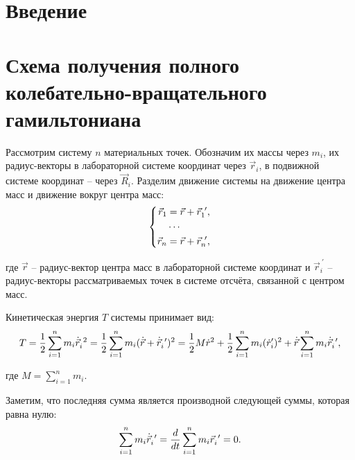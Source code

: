 \documentclass[12pt]{article}
\begin{document}
\section{Введение}

\section{Схема получения полного колебательно-вращательного гамильтониана}

\hspace{0.35cm} Рассмотрим систему $n$ материальных точек. Обозначим их массы через $m_i$, их радиус-векторы в лабораторной системе координат через $\vec{r}_i$, в подвижной системе координат -- через $\vec{R}_i$. Разделим движение системы на движение центра масс и движение вокруг центра масс:
\vspace*{-0.1cm}
\begin{gather}
\left\{
\begin{aligned}
\vec{r}_1 &= \vec{r} + \vec{r}_1^{\ \prime}, \\
&\cdots \\
\vec{r}_n &= \vec{r} + \vec{r}_n^{\ \prime},
\end{aligned}
\right. \notag
\end{gather}

\hspace*{-0.75cm} где $\vec{r}$ -- радиус-вектор центра масс в лабораторной системе координат и $\vec{r}_i^{\ \prime}$ -- радиус-векторы рассматриваемых точек в системе отсчёта, связанной с центром масс.

Кинетическая энергия $T$ системы принимает вид: 
\vspace*{-0.1cm}
\begin{gather}
T = \frac{1}{2} \sum_{i=1}^{n} m_i \dot{\vec{r}}_i^{\ 2} = \frac{1}{2} \sum_{i=1}^{n} m_i (\dot{\vec{r}} + \dot{\vec{r}}_i^{\ \prime})^2  = \frac{1}{2} M \dot{r}^2 + \frac{1}{2} \sum_{i=1}^{n} m_i ( \dot{r}_i^\prime)^2 + \dot{\vec{r}} \sum_{i=1}^{n} m_i \dot{\vec{r}}_i^{\ \prime}, \notag
\end{gather}

\hspace*{-0.75cm} где $M = \sum_{i=1}^{n} m_i$.

Заметим, что последняя сумма является производной следующей суммы, которая равна нулю: 
\vspace*{-0.1cm}
\begin{gather}
\sum_{i=1}^{n} m_i \dot{\vec{r}}_i^{\ \prime} = \frac{d}{dt} \sum_{i=1}^{n} m_i \vec{r}_i^{\ \prime} = 0. \notag
\end{gather}
\end{document}
